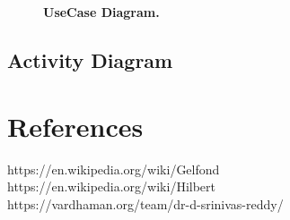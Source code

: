 \documentclass[12pt]{article}
\begin{document}
\begin{figure}[!htbp]
  \centering
  \caption{\textbf{UseCase Diagram.}}
\end{figure}
\newpage

\subsection*{ Activity Diagram}
\begin{figure}[!htbp]
  \centering

  \end{figure}
  
\newpage

\section*{\centering References}

https://en.wikipedia.org/wiki/Gelfond%
\\
https://en.wikipedia.org/wiki/Hilbert%
\\
https://vardhaman.org/team/dr-d-srinivas-reddy/ \\
\end{document}
